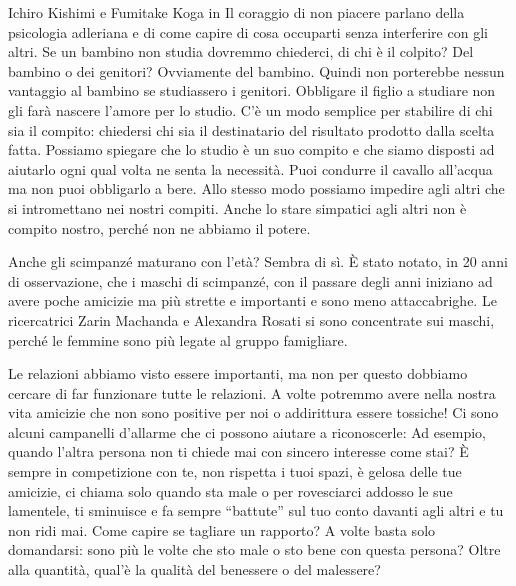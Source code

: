 \documentclass[12pt]{book} %
\begin{document}
Ichiro Kishimi e Fumitake Koga in Il coraggio di non piacere parlano
della psicologia adleriana e di come capire di cosa occuparti senza interferire con gli altri. Se un bambino non studia
dovremmo chiederci, di chi è il colpito? Del bambino o dei genitori? Ovviamente del bambino. Quindi non porterebbe
nessun vantaggio al bambino se studiassero i genitori. Obbligare il figlio a studiare non gli farà nascere l'amore per
lo studio. C'è un modo semplice per stabilire di chi sia il compito: chiedersi chi sia il
destinatario del risultato prodotto dalla scelta fatta. Possiamo spiegare che lo studio è un suo compito e che siamo
disposti ad aiutarlo ogni qual volta ne senta la necessità.
\newline
\newline
Puoi condurre il cavallo all'acqua ma non puoi obbligarlo a bere.
\newline
\newline
Allo stesso modo possiamo impedire agli altri che si intromettano nei nostri compiti. Anche lo stare simpatici agli
altri non è compito nostro, perché non ne abbiamo il potere.


\bigskip
\begin{mdframed}[linewidth=1pt]
Anche gli scimpanzé {\textquotedbl}maturano{\textquotedbl} con l'età? Sembra di sì. È stato notato, in 20 anni di
osservazione, che i maschi di scimpanzé, con il passare degli anni iniziano ad avere poche amicizie ma più strette e
importanti e sono meno attaccabrighe. Le ricercatrici Zarin Machanda e Alexandra Rosati si sono concentrate sui maschi,
perché le femmine sono più legate al gruppo famigliare. 
\end{mdframed}

\bigskip

Le relazioni abbiamo visto essere importanti, ma non per questo dobbiamo cercare di far funzionare tutte le relazioni. A
volte potremmo avere nella nostra vita amicizie che non sono positive per noi o addirittura essere tossiche! Ci sono
alcuni campanelli d'allarme che ci possono aiutare a riconoscerle: Ad esempio, quando
l'altra persona non ti chiede mai con sincero interesse come stai? È sempre in competizione con
te, non rispetta i tuoi spazi, è gelosa delle tue amicizie, ci chiama solo quando sta male o per rovesciarci addosso le
sue lamentele, ti sminuisce e fa sempre “battute” sul tuo conto davanti agli altri e tu non ridi
mai.
Come capire se tagliare un rapporto? A volte basta solo domandarsi: sono più le volte che sto male o sto bene con questa persona? Oltre alla quantità, qual'è la qualità del benessere o del malessere?
\end{document}
